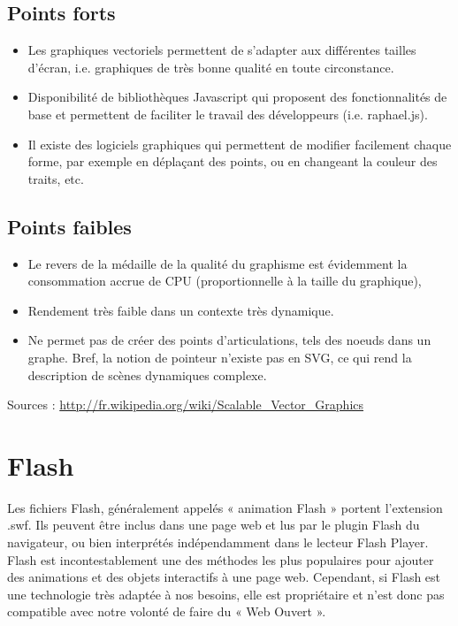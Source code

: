 \documentclass[a4paper,10pt]{report}
\begin{document}
\subsection{Points forts}

\begin{itemize}
  \item Les graphiques vectoriels permettent de s'adapter aux différentes tailles d'écran, 
  i.e. graphiques de très bonne qualité en toute circonstance.
  \item Disponibilité de bibliothèques Javascript qui proposent des fonctionnalités de base 
  et permettent de faciliter le travail des développeurs (i.e. raphael.js).
  \item Il existe des logiciels graphiques qui permettent de modifier facilement chaque
  forme, par exemple en déplaçant des points, ou en changeant la couleur des traits, etc.
\end{itemize}

\subsection{Points faibles}

\begin{itemize}
  \item Le revers de la médaille de la qualité du graphisme est évidemment la consommation 
  accrue de CPU (proportionnelle à la taille du graphique),
  \item Rendement très faible dans un contexte très dynamique.
  \item Ne permet pas de créer des points d'articulations, tels des noeuds dans un graphe. 
  Bref, la notion de pointeur n'existe pas en SVG, ce qui rend la description de scènes 
  dynamiques complexe.
\end{itemize}

Sources : \url{http://fr.wikipedia.org/wiki/Scalable_Vector_Graphics}

\section{Flash}
Les fichiers Flash, généralement appelés « animation Flash » portent l'extension .swf. 
Ils peuvent être inclus dans une page web et lus par le plugin Flash du navigateur, ou 
bien interprétés indépendamment dans le lecteur Flash Player. Flash est incontestablement 
une des méthodes les plus populaires pour ajouter des animations et des objets
 interactifs à une page web. 
Cependant, si Flash est une technologie très adaptée à nos besoins, elle est propriétaire
 et n'est donc pas compatible avec notre volonté de faire du « Web Ouvert ».
 
\end{document}
